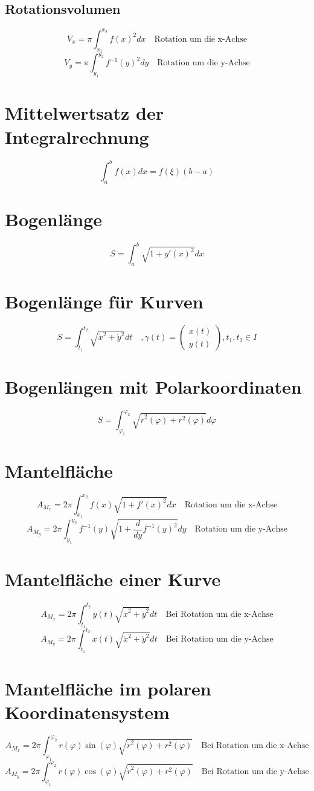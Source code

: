 \subsection{Rotationsvolumen}
\[ \boxed{V_x = \pi \int_{x_1}^{x_2} f(x)^2 dx} \quad 
\text{Rotation um die x-Achse}\]
\[ \boxed{V_y = \pi \int_{y_1}^{y_2} f^{-1}(y)^2 dy} \quad 
\text{Rotation um die y-Achse}\]

\section{Mittelwertsatz der Integralrechnung}
\[ \boxed{\int_{a}^{b} f(x) dx = f(\xi)(b-a)} \]

\section{Bogenlänge}
\[ \boxed{S = \int_{a}^{b} \sqrt{1 + y'(x)^2} dx} \]

\section{Bogenlänge für Kurven}
\[ \boxed{S = \int_{t_1}^{t_2}\sqrt{\dot{x}^2 + \dot{y}^2} dt \quad ,\gamma(t) 
= \left(\begin{matrix}x(t)\\y(t)\end{matrix}\right), t_1, t_2 \in I} \]

\section{Bogenlängen mit Polarkoordinaten}
\[ \boxed{S = \int_{\varphi_1}^{\varphi_2}\sqrt{\dot{r}^2(\varphi) + 
r^2(\varphi)}d\varphi} \]

\section{Mantelfläche}
\[ \boxed{A_{M_x} = 2 \pi \int_{x_1}^{x_2}f(x) \sqrt{1 + f'(x)^2} dx} \quad 
\text{Rotation um die x-Achse} \]
\[ \boxed{A_{M_y} = 2 \pi \int_{y_1}^{y_2}f^{-1}(y) \sqrt{1 + 
\frac{d}{dy}f^{-1}(y)^2} dy} \quad \text{Rotation um die y-Achse} \]

\section{Mantelfläche einer Kurve}
\[ \boxed{A_{M_x} = 2 \pi \int_{t_1}^{t_2} y(t) \sqrt{\dot{x}^2 + \dot{y}^2}dt} 
\quad \text{Bei Rotation um die x-Achse} \]
\[ \boxed{A_{M_y} = 2 \pi \int_{t_1}^{t_2} x(t) \sqrt{\dot{x}^2 + \dot{y}^2}dt} 
\quad \text{Bei Rotation um die y-Achse} \]

\section{Mantelfläche im polaren Koordinatensystem}
\[ \boxed{A_{M_x} = 2 \pi \int_{\varphi_1}^{\varphi_2}r(\varphi) \sin(\varphi)
\sqrt{\dot{r}^2(\varphi) + r^2(\varphi)}} \quad 
\text{Bei Rotation um die x-Achse} \]
\[ \boxed{A_{M_y} = 2 \pi \int_{\varphi_1}^{\varphi_2}r(\varphi) \cos(\varphi)
\sqrt{\dot{r}^2(\varphi) + r^2(\varphi)}} \quad 
\text{Bei Rotation um die y-Achse} \]
